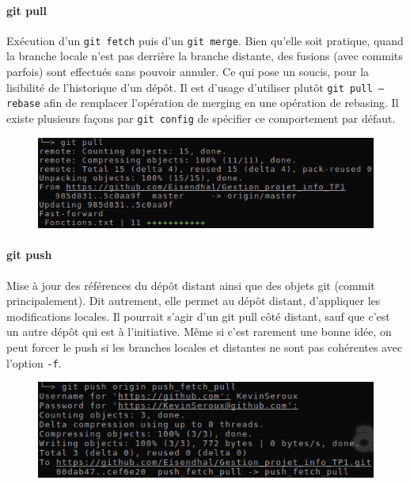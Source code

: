 \documentclass[11pt,canadien]{article}
\begin{document}
\paragraph{git pull}Exécution d'un \texttt{git fetch} puis d'un \texttt{git merge}. Bien qu'elle soit pratique, quand la branche locale n'est pas derrière la branche distante, des fusions (avec commits parfois) sont effectués sans pouvoir annuler. Ce qui pose un soucis, pour la lisibilité de l'historique d'un dépôt. Il est d'usage d'utiliser plutôt \texttt{git pull --rebase} afin de remplacer l'opération de merging en une opération de rebasing. Il existe plusieurs façons par \texttt{git config} de spécifier ce comportement par défaut.
\begin{figure}[H]
	\centering
	\includegraphics{images/git_pull.png}
\end{figure}

\paragraph{git push}Mise à jour des références du dépôt distant ainsi que des objets git (commit principalement). Dit autrement, elle permet au dépôt distant, d'appliquer les modifications locales. Il pourrait s'agir d'un git pull côté distant, sauf que c'est un autre dépôt qui est à l'initiative. Même si c'est rarement une bonne idée, on peut forcer le push si les branches locales et distantes ne sont pas cohérentes avec l'option \texttt{-f}.
\begin{figure}[H]
	\centering
	\includegraphics{images/git_push.png}
\end{figure}
\end{document}
